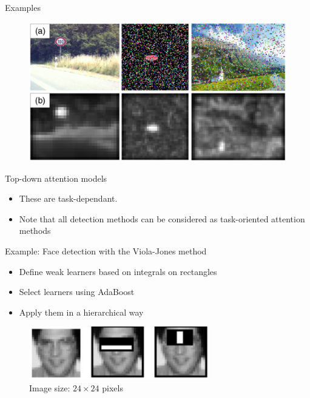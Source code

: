 \documentclass[xcolor=pdftex,dvipsnames,table,mathserif]{beamer}
\begin{document}


\begin{frame}{Examples \cite{itti_model_1998}}

\begin{figure}[ht]
  \centering
  \includegraphics[width=\textwidth]{saliency_maps_itti}
\end{figure}


\end{frame}

\begin{frame}{Top-down attention models}

  \begin{itemize}
  \item These are task-dependant.
  \item Note that all detection methods can be considered as task-oriented attention methods
  \end{itemize}

  \begin{block}{Example: Face detection with the Viola-Jones method~\cite{viola_rapid_2001}}
    \begin{itemize}
    \item Define weak learners based on integrals on rectangles
    \item Select learners using AdaBoost
    \item Apply them in a hierarchical way
    \end{itemize}

\begin{figure}[ht]
  \centering
  \includegraphics[width=0.7\textwidth]{viola_jones_features}\\
  \scriptsize{Image size: $24 \times 24$ pixels}
\end{figure}


  \end{block}

\end{frame}
\end{document}

